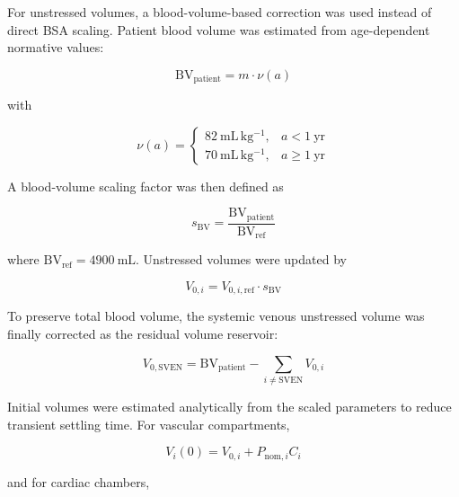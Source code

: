 \documentclass{article}
\begin{document}
For unstressed volumes, a blood-volume-based correction was used instead of direct BSA scaling. Patient blood volume was estimated from age-dependent normative values:

\begin{equation}
    \mathrm{BV}_{\mathrm{patient}} = m \cdot \nu(a)
    \label{eq:bv_patient}
\end{equation}

with

\begin{equation}
    \nu(a) =
    \begin{cases}
        82\ \mathrm{mL\,kg^{-1}}, & a < 1\ \mathrm{yr} \\
        70\ \mathrm{mL\,kg^{-1}}, & a \geq 1\ \mathrm{yr}
    \end{cases}
    \label{eq:bv_norm}
\end{equation}

A blood-volume scaling factor was then defined as

\begin{equation}
    s_{\mathrm{BV}} =
    \frac{\mathrm{BV}_{\mathrm{patient}}}{\mathrm{BV}_{\mathrm{ref}}}
    \label{eq:bv_scale}
\end{equation}

\noindent where $\mathrm{BV}_{\mathrm{ref}} = 4900\ \mathrm{mL}$. Unstressed volumes were updated by

\begin{equation}
    V_{0,i} = V_{0,i,\mathrm{ref}} \cdot s_{\mathrm{BV}}
    \label{eq:v0_scaling}
\end{equation}

To preserve total blood volume, the systemic venous unstressed volume was finally corrected as the residual volume reservoir:

\begin{equation}
    V_{0,\mathrm{SVEN}} =
    \mathrm{BV}_{\mathrm{patient}}
    - \sum_{i \neq \mathrm{SVEN}} V_{0,i}
    \label{eq:sven_conservation}
\end{equation}

Initial volumes were estimated analytically from the scaled parameters to reduce transient settling time. For vascular compartments,

\begin{equation}
    V_i(0) = V_{0,i} + P_{\mathrm{nom},i} C_i
    \label{eq:ic_vascular}
\end{equation}

and for cardiac chambers,
\end{document}
